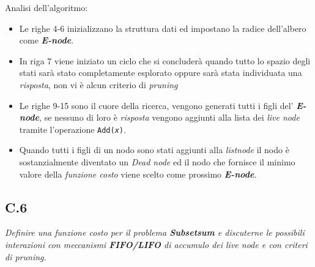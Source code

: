 \documentclass[a4paper]{article}
\newcommand{\imp}[1]{\textbf{\textit{#1}}}
\begin{document}
Analisi dell'algoritmo:
\begin{itemize}
	\item Le righe 4-6 inizializzano la struttura dati ed impostano la radice dell'albero come \imp{E-node}.
	\item In riga 7 viene iniziato un ciclo che si concluderà quando tutto lo spazio degli stati sarà stato completamente esplorato oppure sarà stata individuata una \textit{risposta}, non vi è alcun criterio di \textit{pruning}
	\item Le righe 9-15 sono il cuore della ricerca, vengono generati tutti i figli del' \imp{E-node}, se nessuno di loro è \textit{risposta} vengono aggiunti alla lista dei \textit{live node} tramite l'operazione \texttt{Add(\textit{x})}. %
	\item Quando tutti i figli di un nodo sono stati aggiunti alla \textit{listnode} il nodo è sostanzialmente diventato un \textit{Dead node} ed il nodo che fornisce il minimo valore della \textit{funzione costo} viene scelto come prossimo \imp{E-node}.
\end{itemize}
\subsection{C.6}
\label{SEC:C6}
\emph{Definire una funzione costo per il problema \textbf{Subsetsum} e discuterne le possibili interazioni con meccanismi \textbf{FIFO/LIFO} di accumulo dei live node e con criteri di pruning.}
\end{document}

